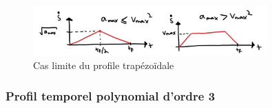 \begin{figure}[ht]
	\centering
		\includegraphics[width=0.80\textwidth]{fig/trap_profile_triangle.jpg}
	\caption{Cas limite du profile trapézoïdale}
	\label{fig:trap_profile_triangle}
\end{figure}

\subsubsection{Profil temporel polynomial d'ordre 3}


